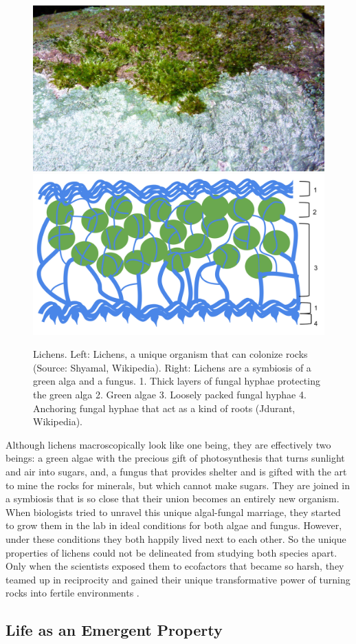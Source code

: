 \documentclass[
  11pt,
]{book}
\begin{document}
\begin{figure}

{\centering \includegraphics[width=0.45\linewidth]{./figs/lichen} \includegraphics[width=0.45\linewidth]{./figs/LichenDiagram} 

}

\caption{Lichens. Left: Lichens, a unique organism that can colonize rocks (Source: Shyamal, Wikipedia). Right: Lichens are a symbiosis of a green alga and a fungus. 1. Thick layers of fungal hyphae protecting the green alga 2. Green algae 3. Loosely packed fungal hyphae 4. Anchoring fungal hyphae that act as a kind of roots (Jdurant, Wikipedia).}\label{fig:lichen}
\end{figure}

Although lichens macroscopically look like one being, they are effectively two beings: a green algae with the precious gift of photosynthesis that turns sunlight and air into sugars, and, a fungus that provides shelter and is gifted with the art to mine the rocks for minerals, but which cannot make sugars. They are joined in a symbiosis that is so close that their union becomes an entirely new organism. When biologists tried to unravel this unique algal-fungal marriage, they started to grow them in the lab in ideal conditions for both algae and fungus. However, under these conditions they both happily lived next to each other. So the unique properties of lichens could not be delineated from studying both species apart. Only when the scientists exposed them to ecofactors that became so harsh, they teamed up in reciprocity and gained their unique transformative power of turning rocks into fertile environments \citep{Kimmerer2013}.

\hypertarget{life-as-an-emergent-property}{%
\subsection{Life as an Emergent Property}\label{life-as-an-emergent-property}}
\end{document}
